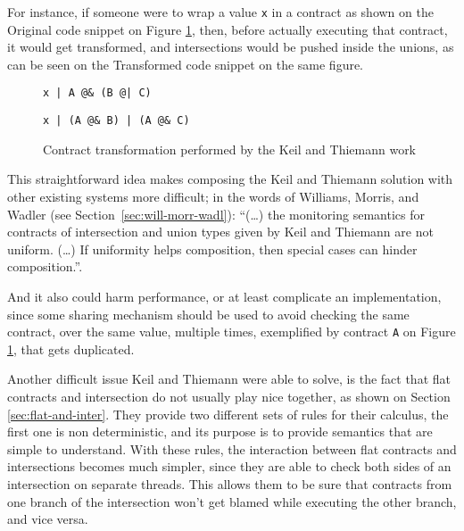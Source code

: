 \documentclass[sigplan,10pt,review,anonymous]{acmart}
\newcommand{\unsure}[2][1=]{}
\newcommand{\info}[2][1=]{}
\newcommand{\nickel}[1]{\lstinline[language=nickel]{#1}}
\begin{document}
For instance, if someone were to wrap a value \nickel{x}
in a contract as shown on the Original code snippet on Figure
\ref{fig:kt-contract-transf}, then, before actually executing that
contract, it would get transformed, and intersections would
be pushed inside the unions, as can be seen on the Transformed
code snippet on the same figure.

\begin{figure}[h]
\begin{lstlisting}[language=nickel, title=Original]
x | A @& (B @| C)
\end{lstlisting}
\begin{lstlisting}[language=nickel, title=Transformed]
x | (A @& B) | (A @& C)
\end{lstlisting}
\caption{Contract transformation performed by the Keil and
Thiemann work}
\label{fig:kt-contract-transf}
\end{figure}

This straightforward idea makes composing the Keil and Thiemann
solution with other existing systems more difficult; in the words
of Williams, Morris, and Wadler (see Section~\ref{sec:will-morr-wadl}):
``(\ldots) the monitoring semantics for contracts of intersection and union types given by Keil
and Thiemann are not uniform. (\ldots) If uniformity helps composition, then
special cases can hinder composition.''\cite{RootCauseOfBlame}.
\info{(Yann) Does
it also make it less efficient? If $(A \cap B)$ fails because of $B$, their
development causes to recheck the contract $A$ that has been duplicated?}
And it also could harm performance, or at least complicate an implementation,
since some sharing mechanism should be used to avoid checking the same contract,
over the same value, multiple times, exemplified by contract \nickel{A} on
Figure \ref{fig:kt-contract-transf}, that gets duplicated.
\unsure{Arnaud says: this whole
section is too abstract give concrete code and explain what goes
wrong. It's fine to give code in Nickel syntax}

Another difficult issue Keil and Thiemann were able to solve, is the
fact that flat contracts and intersection do not usually play nice
together, as shown on Section \ref{sec:flat-and-inter}.
They provide two different sets of rules for their calculus,
the first one is non deterministic, and its purpose is to provide
semantics that are simple to understand.
With these rules, the interaction between flat contracts and
intersections becomes much simpler, since they are able to check
both sides of an intersection on separate threads.
This allows them to be sure that contracts from one branch of the intersection
won't get blamed while executing the other branch, and vice versa.
\end{document}
